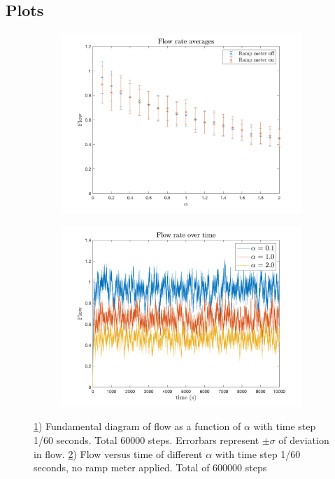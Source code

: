 \documentclass{article}
\begin{document}
  \subsection{Plots}
    \begin{figure}
      \centering
      \begin{subfigure}{0.5\textwidth}
        \centering
        \includegraphics[width=\linewidth]{fig1.png}
        \caption{ }
        \label{sub:1}
      \end{subfigure}%
      \begin{subfigure}{0.5\textwidth}
        \centering
        \includegraphics[width=\linewidth]{fig2.png}
        \caption{ }
        \label{sub:2}
      \end{subfigure}
      \caption{\ref{sub:1}) Fundamental diagram of flow as a function of $\alpha$ with time step 1/60 seconds. Total
      60000 steps. Errorbars represent $\pm\sigma$ of deviation in flow.
      \ref{sub:2}) Flow versus time of different $\alpha$ with time step 1/60 seconds, no ramp meter applied. Total of 600000 steps}
      \label{fig:fund}
    \end{figure}
\end{document}
